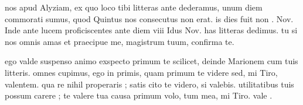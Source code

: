 


 nos apud Alyziam, ex quo loco tibi litteras ante dederamus, unum diem commorati sumus, quod Quintus nos consecutus non erat. is dies fuit non . Nov. Inde ante lucem proficiscentes ante diem viii Idus Nov. has litteras dedimus. tu si nos omnis amas et praecipue me, magistrum tuum, confirma te.

 ego valde suspenso animo exspecto primum te scilicet, deinde Marionem cum tuis litteris. omnes cupimus, ego in primis, quam primum te videre sed, mi Tiro, valentem. qua re nihil properaris ; satis cito te videro, si valebis. utilitatibus tuis possum carere ; te valere tua causa primum volo, tum mea, mi Tiro. vale .
